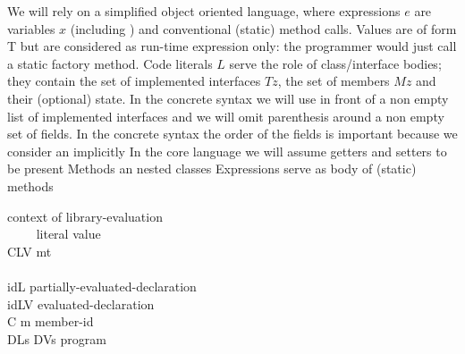 We will rely on a simplified object oriented language, where expressions $e$ are variables $x$ (including \Q@this@)
and conventional (static) method calls.
Values are of form  T but are considered as run-time expression only: the programmer would just call a static factory method.
Code literals $L$
serve the role of class/interface bodies; they contain the set of implemented interfaces
$Tz$, the set of members $Mz$ and their (optional) state.
In the concrete syntax we will use \Q@implements@ in front of a non empty list of implemented interfaces
and we will omit parenthesis around a non empty set of fields.
In the concrete syntax the order of the fields is important because we consider
an implicitly 
In the core language we will assume getters and setters to be present
Methods an nested classes
Expressions serve as body of (static) methods


\begin{bnf}
  {context of library-evaluation}\\     {\ \ \mmid{}\ \ }       {literal value}\\     {C\eq{}LV \mmid{} mt}                                                    {}\\           {}\\     {id\eq{}L}                                                         {partially-evaluated-declaration}\\     {id\eq{}LV}                                                       {evaluated-declaration}\\    {C \mmid{} m}                                                      {member-id}\\      {DLs\Q{;} DVs}                                                     {program}
\end{bnf}

